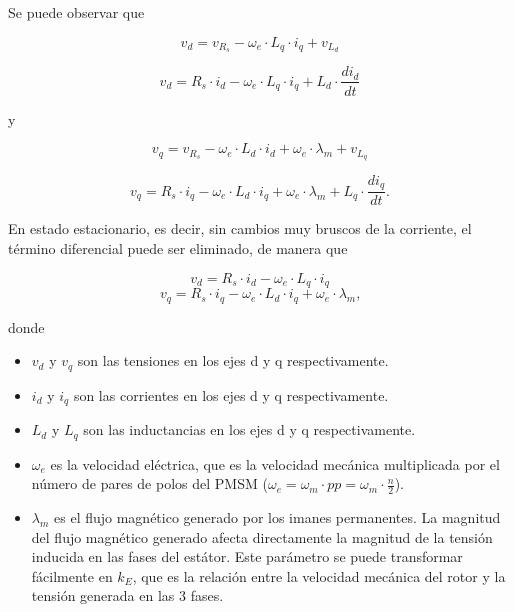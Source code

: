 Se puede observar que

\begin{equation}
v_d = v_{R_s} - \omega_e \cdot L_q \cdot i_q + v_{L_d}
\end{equation}

\begin{equation}
v_d = R_s\cdot i_d - \omega_e \cdot L_q \cdot i_q + L_d\cdot\frac{d i_d}{d t}
\end{equation}

y

\begin{equation}
v_q = v_{R_s} - \omega_e \cdot L_d \cdot i_d + \omega_e \cdot \lambda_m + v_{L_q}
\end{equation}

\begin{equation}
v_q = R_s\cdot i_q - \omega_e \cdot L_d \cdot i_q + \omega_e \cdot \lambda_m + L_q\cdot\frac{d i_q}{d t}  \text{.}
\end{equation}

En estado estacionario, es decir, sin cambios muy bruscos de la corriente, el término diferencial puede ser eliminado, de manera que

\begin{equation}
	v_d = R_s\cdot i_d - \omega_e \cdot L_q \cdot i_q
	\label{eq_vd}
\end{equation}
\begin{equation}
	v_q = R_s\cdot i_q - \omega_e \cdot L_d \cdot i_q + \omega_e \cdot \lambda_m
	\label{eq_vq} \text{,}
\end{equation}


donde
\begin{itemize}
    \item \(v_d\) y \(v_q\) son las tensiones en los ejes d y q respectivamente.
    \item \(i_d\) y \(i_q\) son las corrientes en los ejes d y q respectivamente.
    \item \(L_d\) y \(L_q\) son las inductancias en los ejes d y q respectivamente.
    \item \(\omega_e\) es la velocidad eléctrica, que es la velocidad mecánica multiplicada por el número de pares de polos del PMSM (\(\omega_e = \omega_m \cdot pp = \omega_m \cdot \frac{n}{2}\)).
    \item \(\lambda_m\) es el flujo magnético generado por los imanes permanentes. La magnitud del flujo magnético generado afecta directamente la magnitud de la tensión inducida en las fases del estátor. Este parámetro se puede transformar fácilmente en \(k_E\), que es la relación entre la velocidad mecánica del rotor y la tensión generada en las 3 fases.
\end{itemize}


